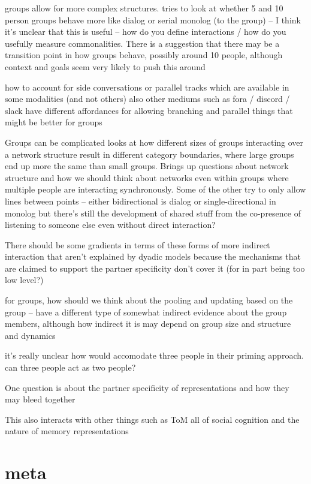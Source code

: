 \documentclass[]{article}
\begin{document}
groups allow for more complex structures. \cite{fay2000} tries to look at whether 5 and 10 person groups behave more like dialog or serial monolog (to the group) -- I think it's unclear that this is useful -- how do you define interactions / how do you usefully measure commonalities. There is a suggestion that there may be a transition point in how groups behave, possibly around 10 people, although context and goals seem very likely to push this around 

how to account for side conversations or parallel tracks which are available in some modalities (and not others) also other mediums such as fora / discord / slack have different affordances for allowing branching and parallel things that might be better for groups 

Groups can be complicated \cite{guilbeault2021} looks at how different sizes of groups interacting over a network structure result in different category boundaries, where large groups end up more the same than small groups. Brings up questions about network structure and how we should think about networks even within groups where multiple people are interacting synchronously. Some of the other try to only allow lines between points -- either bidirectional is dialog or single-directional in monolog but there's still the development of shared stuff from the co-presence of listening to someone else even without direct interaction? 

There should be some gradients in terms of these forms of more indirect interaction that aren't explained by dyadic models because the mechanisms that are claimed to support the partner specificity don't cover it (for in part being too low level?)

\cite{hawkins2021} for groups, how should we think about the pooling and updating based on the group -- have a different type of somewhat indirect evidence about the group members, although how indirect it is may depend on group size and structure and dynamics 

it's really unclear how \cite{pickering2004} would accomodate three people in their priming approach. can three people act as two people? 


One question is about the partner specificity of representations and how they may bleed together

This also interacts with other things such as ToM all of social cognition and the nature of memory representations 



\section{meta}
\end{document}
